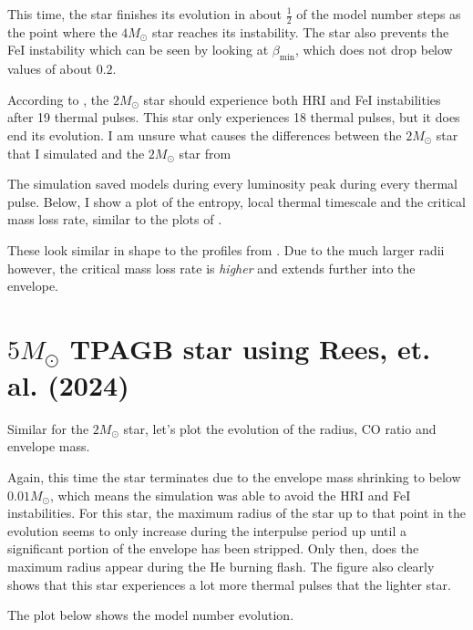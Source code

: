 \documentclass[a4paper,10pt]{article}
\begin{document}
This time, the star finishes its evolution in about \(\frac{1}{2}\) of the model number steps as the point where the \(4M_\odot \) star reaches its instability.
The star also prevents the FeI instability which can be seen by looking at \(\beta _\text{min}\), which does not drop below values of about \(0.2\).

According to \citet{rees2024b}, the \(2M_\odot \) star should experience both HRI and FeI instabilities after 19 thermal pulses.
This star only experiences 18 thermal pulses, but it does end its evolution.
I am unsure what causes the differences between the \(2M_\odot \) star that I simulated and the \(2M_\odot \) star from \citet{rees2024a,rees2024b}

The simulation saved models during every luminosity peak during every thermal pulse.
Below, I show a plot of the entropy, local thermal timescale and the critical mass loss rate, similar to the plots of \citet{temmink2022}. 

\begin{figure}[ht]
    \centering
\end{figure}

These look similar in shape to the profiles from \citet{temmink2022}.
Due to the much larger radii however, the critical mass loss rate is \emph{higher} and extends further into the envelope. 


\newpage
\section{\texorpdfstring{$5 M_\odot $}{5 solar mass} TPAGB star using Rees, et. al. (2024)}
Similar for the \(2M_\odot \) star, let's plot the evolution of the radius, CO ratio and envelope mass.
\begin{figure}[ht]
    \centering
\end{figure}

Again, this time the star terminates due to the envelope mass shrinking to below \(0.01M_\odot \), which means the simulation was able to avoid the HRI and FeI instabilities.
For this star, the maximum radius of the star up to that point in the evolution seems to only increase during the interpulse period up until a significant portion of the envelope has been stripped. Only then, does the maximum radius appear during the He burning flash.
The figure also clearly shows that this star experiences a lot more thermal pulses that the lighter star.

The plot below shows the model number evolution.
\end{document}
